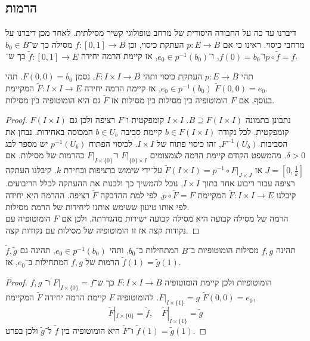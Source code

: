 \subsection{הרמות}
דיברנו עד כה על החבורה היסודית של מרחב טופולוגי קשיר מסילתית.
לאחר מכן דיברנו על מרחבי כיסוי.
ראינו כי אם $p : E \to B$ העתקת כיסוי, וכן $f : [0, 1] \to B$ מסילה כך ש־$b_0 \in B$ ו־$f(0) = b_0$, ו־$e_0 \in p^{-1}(b_0)$,
אז קיימת הרמה יחידה $\tilde{f} : [0, 1] \to E$ כך ש־$p \circ \tilde{f} = f$.
\begin{theorem}
	תהי $p : E \to B$ העתקת כיסוי ותהי $F : I \times I \to B$, נסמן $F(0, 0) = b_0$.
	תהי $e_0 \in p^{-1}(b_0)$, אז קיימת הרמה יחידה $\tilde{F} : I \times I \to E$ המקיימת $\tilde{F}(0, 0) = e_0$. \\
	בנוסף, אם $F$ הומוטופיה בין מסילות בין מסילות אז $\tilde{F}$ גם היא הומוטופיה בין מסילות.
\end{theorem}
\begin{proof}
	נתבונן בתמונה $B \supseteq F(I \times I)$. $I \times I$ קומפקטית ו־$F$ רציפה ולכן גם $F(I \times I)$ קומפקטית.
	לכל נקודה $b \in F(I \times I)$ קיימת סביבה $b \in U_b$ המכוסה באחידות.
	נבחן את הסביבות $F^{-1}(U_b)$, זהו כיסוי פתוח של $I \times I$.
	לכיסוי הפתוח $p^{-1}(U_b)$ יש מספר לבג $\delta > 0$.
	מהמשפט הקודם קיימת הרמה לצמצומים $F |_{\{ 0 \} \times I}$ ו־$F |_{I \times \{ 0 \}}$ כהרמות של מסילות.
	אם $J = [0, \frac{1}{k}]$ אז $\tilde{F}(I \times I) = p^{-1} \circ F |_{J \times J}$ על־ידי שימוש ברציפות ובחירת $k$.
	קיבלנו העתקה רציפה עבור ריבוע אחד בתוך $I \times I$, נוכל להמשיך כך ולבנות את ההעתקה לכלל הריבועים.
	קיבלנו $\tilde{F} : I \times I \to E$ המקיימת $p \circ \tilde{F} = F$, לפי למת ההדבקה $\tilde{F}$ רציפה.
	ההרמה היא יחידה לפי אותו טיעון ששימש אותנו ליחידות של הרמת מסילות. \\
	הרמה של מסילה קבועה היא מסילה קבועה ישירות מהגדרתה, ולכן אם $F$ הומוטופיה עם נקודות קצה אז זו הומוטופיה של מסילות עם נקודות קצה.
\end{proof}
\begin{corollary}
	תהינה $f, g$ מסילות הומוטופיות ב־$B$ המתחילות ב־$b_0$, ותהי $e_0 \in p^{-1}(b_0)$, תהינה גם $\tilde{f}, \tilde{g}$ הרמות של $f, g$ המתחילות ב־$e_0$, אז $\tilde{f}(1) = \tilde{g}(1)$.
\end{corollary}
\begin{proof}
	$f, g$ הומוטופיות ולכן קיימת הומוטופיה $F : I \times I \to B$ כך ש־$F |_{I \times \{ 0 \}} = f$ ו־$F |_{I \times \{ 1 \}} = g$.
	להומוטופיה $F$ קיימת הרמה יחידה $\tilde{F}$ המקיימת $\tilde{F}(0, 0) = e_0$,
	\[
		\tilde{F} |_{I \times \{ 0 \}} = \tilde{f},
		\quad
		\tilde{F} |_{I \times \{ 1 \}} = \tilde{g}
	\]
	ו־$\tilde{F}$ היא הומוטופיה בין $\tilde{f}$ ל־$\tilde{g}$ ולכן בפרט $\tilde{f}(1) = \tilde{g}(1)$.
\end{proof}

